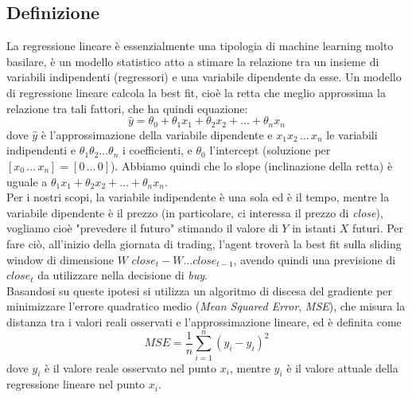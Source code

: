 \documentclass[binding=0.6cm]{sapthesis}
\begin{document}
			\subsection{Definizione}
				La regressione lineare è essenzialmente una tipologia di machine learning molto basilare, è un modello statistico atto a stimare la relazione tra un insieme di variabili indipendenti (regressori)
				e una variabile dipendente da esse. Un modello di regressione lineare calcola la best fit, cioè la retta che meglio approssima la relazione tra tali fattori, che ha quindi equazione:
				\[ \hat{y} = \theta_0 + \theta_1x_1 + \theta_2x_2 + ... + \theta_nx_n \]
				dove $\hat{y}$ è l'approssimazione della variabile dipendente e $x_1 x_2 \,...\, x_n$ le variabili indipendenti e $\theta_1 \theta_2 ... \theta_n$ i coefficienti, e $\theta_0$ l'intercept
				(soluzione per $[x_0 \,...\, x_n] = [0 \,...\, 0]$). Abbiamo quindi che lo slope (inclinazione della retta) è uguale a $\theta_1x_1 + \theta_2x_2 + ... + \theta_nx_n$. \\
				Per i nostri scopi, la variabile indipendente è una sola ed è il tempo, mentre la variabile dipendente è il prezzo (in particolare, ci interessa il prezzo di \textit{close}), vogliamo cioè
				"prevedere il futuro" stimando il valore di $Y$ in istanti $X$ futuri. Per fare ciò, all'inizio della giornata di trading, l'agent troverà la best fit sulla sliding window di dimensione $W$
				$close_t-W...close_{t-1}$, avendo quindi una previsione di $close_t$ da utilizzare nella decisione di \textit{buy}. \\
				Basandosi su queste ipotesi si utilizza un algoritmo di discesa del gradiente per minimizzare l'errore quadratico medio (\textit{Mean Squared Error}, \textit{MSE}), che misura la distanza tra
				i valori reali osservati e l'approssimazione lineare, ed è definita come
				\[ MSE = \frac{1}{n} \sum_{i=1}^{n} (y_i - \hat{y}_i)^2 \]
				dove $y_i$ è il valore reale osservato nel punto $x_i$, mentre $\hat{y}_i$ è il valore attuale della regressione lineare nel punto $x_i$.
\end{document}

